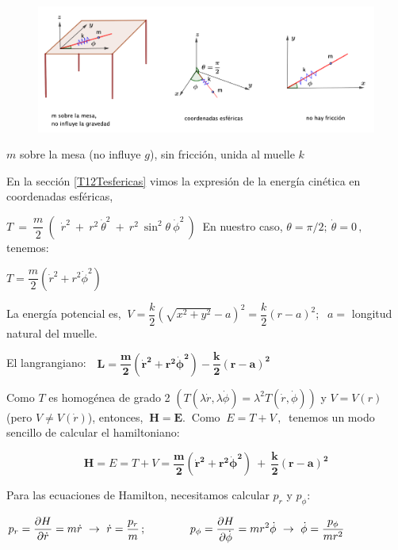 \begin{example}

	\begin{figure}[H]
	\centering
	\includegraphics[width=.95\textwidth]{imagenes/img13-03.png}
\end{figure}

\begin{center}$m$ sobre la mesa (no influye $g$), sin fricción, unida al muelle $k$\end{center}
\end{example}
\vspace{5mm}

En la sección \ref{T12Tesfericas} vimos la expresión de la energía cinética en coordenadas esféricas,

$T \ = \ \dfrac m 2 \ (\ \ \dot r^2 \ + \ r^2 \ \dot \theta^2 \ + \ r^2 \ \sin^2 \theta \ \dot \phi^2 \ ) \  $ En nuestro caso, $\theta=\pi/2;\ \dot \theta=0 \, , \ $ tenemos:

$T=\dfrac m 2 (\dot r^2+r^2 \dot \phi^2) \ $  

La energía potencial es, $\ V=\dfrac k 2 \left( \sqrt{x^2+y^2} - a \right)^2=\dfrac k 2 (r-a)^2$; $\ \ a=$ longitud natural del muelle.

El langrangiano:  $\ \ \ \boldsymbol { L= \dfrac m 2 (\dot r^2+r^2 \dot \phi^2)  - \dfrac k 2 (r-a)^2 }$

Como $T$ es homogénea de grado 2 \textcolor{gris}{$(T(\lambda \dot r, \lambda \dot \phi)=\lambda^2 T(\dot r, \dot \phi))$}  y $V=V(r)$ \textcolor{gris}{(pero $V \neq V(\dot r)$)}, entonces, $\ \boldsymbol{H=E.\ }$  Como $\ E=T+V\, , \ $ tenemos un modo sencillo de calcular el hamiltoniano:

$$\boldsymbol {H}=E=T+V=\boldsymbol { \dfrac m 2 (\dot r^2+r^2 \dot \phi^2)  \ + \  \dfrac k 2 (r-a)^2 }$$

Para las ecuaciones de Hamilton, necesitamos  calcular $p_r$ y $p_\phi$:

$p_r=\displaystyle \pdv{H}{\dot r}=m\dot r \ \to \ \dot r=\dfrac{p_r}{m}\, ; \qquad \qquad
p_\phi=\displaystyle \pdv{H}{\dot \phi}=m r^2 \dot \phi \ \to \ \dot \phi=\dfrac{p_\phi}{mr^2}$

